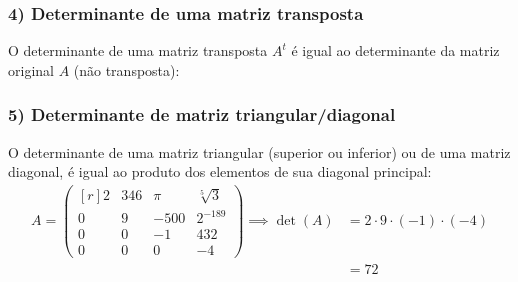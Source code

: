 \documentclass[pdftex, brazil, aspectratio=169]{beamer}
\begin{document}
\begin{frame}[t]

\end{frame}

\begin{frame}[t]
  \frametitle{4) Determinante de uma matriz transposta}
  O determinante de uma matriz transposta $A^t$ é igual ao determinante da
  matriz original $A$ (não transposta):

\end{frame}

\begin{frame}[t]
  \frametitle{5) Determinante de matriz triangular/diagonal}
  O determinante de uma matriz triangular (superior ou inferior) ou de uma
  matriz diagonal, é igual ao produto dos elementos de sua diagonal principal:
  \begin{equation*}\begin{split}A = \begin{pmatrix*}[r]
    2 & 346 & \pi & \sqrt[5]{3}\\
    0 & 9 & -500 & 2^{-189}\\
    0 & 0 & -1 & 432\\
    0 & 0 & 0 & -4\end{pmatrix*} \implies \det(A) &= 2 \cdot 9 \cdot (-1) \cdot (-4)\\
                                               &=72\end{split}\end{equation*}
\end{frame}
\end{document}

